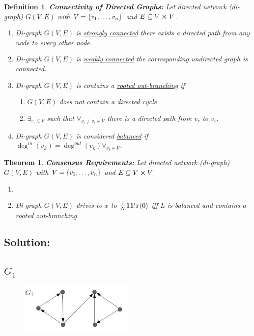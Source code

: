 \documentclass[]{article}
\numberwithin{equation}{section}
\newtheorem{definition}{Definition}
\newtheorem{theorem}{Theorem}
\begin{document}
\begin{definition}
    \textbf{Connectivity of Directed Graphs:} 
    Let directed network (di-graph) $G(V,E)$ with $V = \qty{v_1,\dots,v_n}$ and $E \subseteq V \cross V$.
    \begin{enumerate}
        \item Di-graph $G(V,E)$ is \emph{\underline{strongly connected}} there exists a directed path from any node to every other node.
        \item Di-graph $G(V,E)$ is \emph{\underline{weakly connected}} the corresponding undirected graph is connected.
        \item Di-graph $G(V,E)$ is contains a \underline{\emph{rooted out-branching}} if \begin{enumerate}
            \item $G(V,E)$ does not contain a directed cycle
            \item $\exists_{v_r \in V}$ such that $\forall_{v_i \neq v_r \in V}$ there is a directed path from $v_r$ to $v_i$.
        \end{enumerate}
        \item  Di-graph $G(V,E)$ is considered \underline{\emph{balanced}} if $\deg^{in}(v_k) = \deg^{out}(v_k) \forall_{v_k \in V}$.
    \end{enumerate}
\end{definition}

\begin{theorem}
    \textbf{Consensus Requirements:}
    Let directed network (di-graph) $G(V,E)$ with $V = \qty{v_1,\dots,v_n}$ and $E \subseteq V \cross V$
    \begin{enumerate}
        \item 
        \item Di-graph $G(V,E)$ drives to $x$ to $\frac{1}{N} \vb{1} \vb{1}' x(0)$ iff $L$ is balanced and contains a rooted out-branching.
    \end{enumerate}
\end{theorem}

\subsection*{Solution:}
\subsection{$G_1$}
\begin{figure}[h]
    \centering
    \includegraphics[width=0.5\textwidth]{figs/pblm6a.png}
\end{figure}
\end{document}
